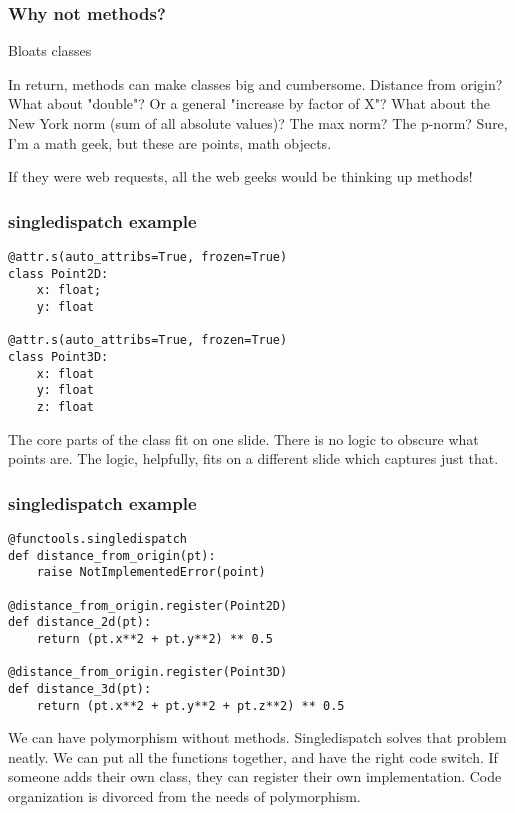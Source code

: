 \begin{frame}[fragile]
\frametitle{Why not methods?}

Bloats classes

\end{frame}

In return,
methods can make classes big and cumbersome.
Distance from origin?
What about "double"?
Or a general "increase by factor of X"?
What about the New York norm
(sum of all absolute values)?
The max norm?
The p-norm?
Sure,
I'm a math geek,
but these are points,
math objects.

If they were web requests,
all the web geeks would be thinking up methods!

\begin{frame}[fragile]
\frametitle{singledispatch example}

\begin{lstlisting}
@attr.s(auto_attribs=True, frozen=True)
class Point2D:
    x: float;
    y: float

@attr.s(auto_attribs=True, frozen=True)
class Point3D:
    x: float
    y: float
    z: float
\end{lstlisting}

\end{frame}

The core parts of the class fit on one slide.
There is no logic to obscure what points are.
The logic,
helpfully,
fits on a different slide which captures just that.

\begin{frame}[fragile]
\frametitle{singledispatch example}

\begin{lstlisting}
@functools.singledispatch
def distance_from_origin(pt):
    raise NotImplementedError(point)

@distance_from_origin.register(Point2D)
def distance_2d(pt):
    return (pt.x**2 + pt.y**2) ** 0.5

@distance_from_origin.register(Point3D)
def distance_3d(pt):
    return (pt.x**2 + pt.y**2 + pt.z**2) ** 0.5
\end{lstlisting}

\end{frame}

We can have polymorphism without methods.
Singledispatch solves that problem neatly.
We can put all the functions together,
and have the right code switch.
If someone adds their own class,
they can register their own implementation.
Code organization is divorced from the needs
of polymorphism.

